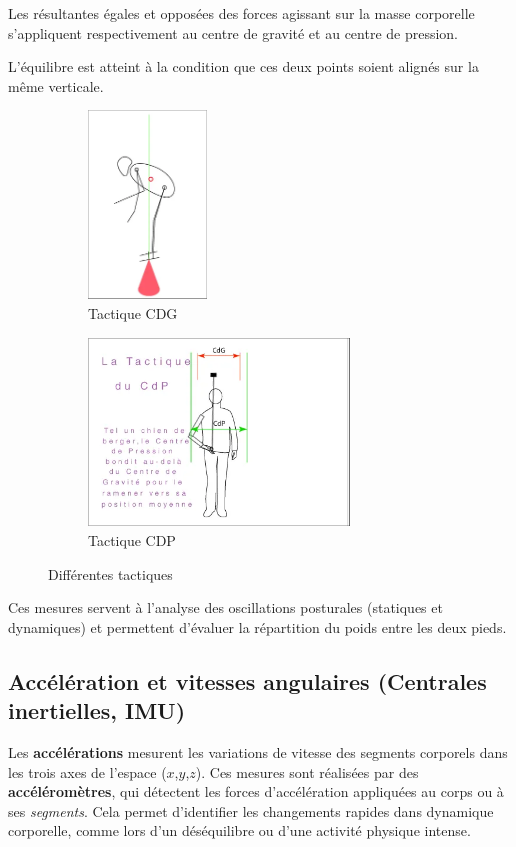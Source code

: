 Les résultantes égales et opposées des forces agissant sur la masse corporelle s'appliquent respectivement au centre de gravité et au centre de pression.

L'équilibre est atteint à la condition que ces deux points soient alignés sur la même verticale.

\begin{figure}[h]
  \centering
  \begin{subfigure}[b]{0.45\textwidth}
    \centering
    \includegraphics[height=5cm]{images/tactique-cdg.png}
    \caption{Tactique CDG}
    \label{fig:tactique_cdg}
  \end{subfigure}
  \hfill
  \begin{subfigure}[b]{0.45\textwidth}
    \centering
    \includegraphics[height=5cm]{images/tactique-cdp.png}
    \caption{Tactique CDP}
    \label{fig:tactique_cdp}
  \end{subfigure}
  \caption{Différentes tactiques}
  \label{fig:2_tactiques}
\end{figure}

Ces mesures servent à l'analyse des oscillations posturales (statiques et dynamiques) et permettent d'évaluer la répartition du poids entre les deux pieds.

\subsection{Accélération et vitesses angulaires (Centrales inertielles, IMU)}

Les \textbf{accélérations} mesurent les variations de vitesse des segments corporels dans les trois axes de l'espace ($x$,$y$,$z$). 
Ces mesures sont réalisées par des \textbf{accéléromètres}, qui détectent les forces d'accélération appliquées au corps ou à ses \textit{segments}. 
Cela permet d'identifier les changements rapides dans dynamique corporelle, comme lors d'un déséquilibre ou d'une activité physique intense.

